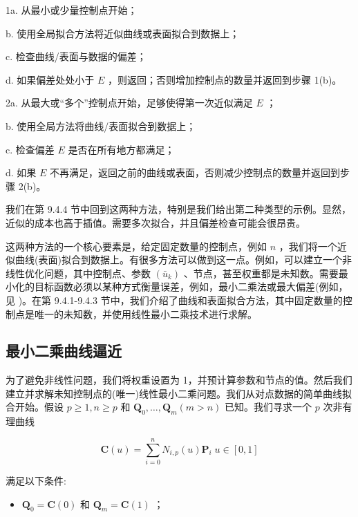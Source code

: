 \documentclass[../main.tex]{subfiles}
\begin{document}
1a. 从最小或少量控制点开始；

b. 使用全局拟合方法将近似曲线或表面拟合到数据上；









c. 检查曲线/表面与数据的偏差；

d. 如果偏差处处小于 \(E\) ，则返回；否则增加控制点的数量并返回到步骤 1(b)。

2a. 从最大或“多个”控制点开始，足够使得第一次近似满足 \(E\) ；

b. 使用全局方法将曲线/表面拟合到数据上；

c. 检查偏差 \(E\) 是否在所有地方都满足；

d. 如果 \(E\) 不再满足，返回之前的曲线或表面，否则减少控制点的数量并返回到步骤 2(b)。

我们在第 9.4.4 节中回到这两种方法，特别是我们给出第二种类型的示例。显然，近似的成本也高于插值。需要多次拟合，并且偏差检查可能会很昂贵。

这两种方法的一个核心要素是，给定固定数量的控制点，例如 \(n\) ，我们将一个近似曲线(表面)拟合到数据上。有很多方法可以做到这一点。例如，可以建立一个非线性优化问题，其中控制点、参数 \(\left( {\bar{u}}_{k}\right)\) 、节点，甚至权重都是未知数。需要最小化的目标函数必须以某种方式衡量误差，例如，最小二乘法或最大偏差(例如，见 \cite{Laur93})。在第 9.4.1-9.4.3 节中，我们介绍了曲线和表面拟合方法，其中固定数量的控制点是唯一的未知数，并使用线性最小二乘技术进行求解。



\subsection{最小二乘曲线逼近}

为了避免非线性问题，我们将权重设置为 1，并预计算参数和节点的值。然后我们建立并求解未知控制点的(唯一)线性最小二乘问题。我们从对点数据的简单曲线拟合开始。假设 \(p \geq  1,n \geq  p\) 和 \({\mathbf{Q}}_{0},\ldots ,{\mathbf{Q}}_{m}\left( {m > n}\right)\) 已知。我们寻求一个 \(p\) 次非有理曲线

\[
\mathbf{C}\left( u\right)  = \mathop{\sum }\limits_{{i = 0}}^{n}{N}_{i,p}\left( u\right) {\mathbf{P}}_{i}\;u \in  \left\lbrack  {0,1}\right\rbrack   \tag{9.61}
\]

满足以下条件:

\begin{itemize}
\item \({\mathbf{Q}}_{0} = \mathbf{C}\left( 0\right)\) 和 \({\mathbf{Q}}_{m} = \mathbf{C}\left( 1\right)\) ；
\end{itemize}
\end{document}
